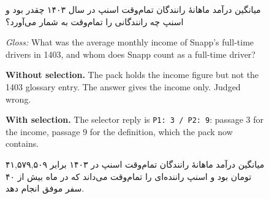\begin{figure}[tp]
\centering
{}
\begin{minipage}[t]{0.495\textwidth}
\begin{tcolorbox}[exc, title={A. The selection call finds the missing definition (Persian)}]
\begin{otherlanguage}{persian}
میانگین درآمد ماهانهٔ رانندگان تمام‌وقت اسنپ در سال ۱۴۰۳ چقدر بود و اسنپ چه رانندگانی را تمام‌وقت به شمار می‌آورد؟\par
\end{otherlanguage}
{\color{cAxis}\textit{Gloss:} What was the average monthly income of Snapp's full-time drivers in 1403, and whom does Snapp count as a full-time driver?\par}
\end{tcolorbox}
\begin{tcolorbox}[exs=cHyb]
\textbf{Without selection.} The pack holds the income figure but not the 1403 glossary entry. The answer gives the income only. Judged wrong.
\end{tcolorbox}
\begin{tcolorbox}[exs=cLex]
\textbf{With selection.} The selector reply is \texttt{P1: 3 / P2: 9}: passage 3 for the income, passage 9 for the definition, which the pack now contains.\par
\begin{otherlanguage}{persian}
میانگین درآمد ماهانهٔ رانندگان تمام‌وقت اسنپ در ۱۴۰۳ برابر ۴۱,۵۷۹,۵۰۹ تومان بود و اسنپ راننده‌ای را تمام‌وقت می‌داند که در ماه بیش از ۴۰ سفر موفق انجام دهد.\par

\end{otherlanguage}
\end{tcolorbox}
\end{minipage}
\end{figure}
